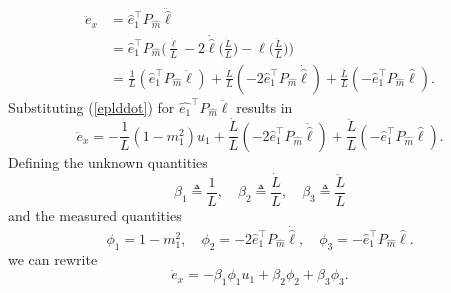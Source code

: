 \begin{align}
\ddot{e}_x&=\hat{e}_1^{\top}P_{\hat{m}}\ddot{\hat{\ell}}
\\&=\hat{e}_1^{\top}P_{\hat{m}}\bigg(\frac{\ddot{\ell}}{L}-2\dot{\hat{\ell}}\bigg(\frac{\dot{L}}{L}\bigg)-\hat{\ell}\bigg(\frac{\ddot{L}}{L}\bigg)\bigg)
\\&=\frac{1}{L}(\hat{e}_1^{\top}P_{\hat{m}}\ddot{\ell})+\frac{\dot{L}}{L}(-2\hat{e}_1^{\top}P_{\hat{m}}\dot{\hat{\ell}})+\frac{\ddot{L}}{L}(-\hat{e}_1^{\top}P_{\hat{m}}\hat{\ell}).
\end{align}
Substituting (\ref{eplddot}) for $\hat{e_1}^{\top}P_{\hat{m}}\ddot{\ell}$ results in  
\begin{equation}
\ddot{e}_x=-\frac{1}{L}(1-m_1^2)u_1+\frac{\dot{L}}{L}(-2\hat{e}_1^{\top}P_{\hat{m}}\dot{\hat{\ell}})+\frac{\ddot{L}}{L}(-\hat{e}_1^{\top}P_{\hat{m}}\hat{\ell}).
\end{equation} 
Defining the unknown quantities
\begin{equation}
\beta_1\triangleq\frac{1}{L},\quad \beta_2\triangleq\frac{\dot{L}}{L}, \quad \beta_3\triangleq\frac{\ddot{L}}{L}
\end{equation}
and the measured quantities
\begin{equation}
\phi_1=1-m_1^2,\quad \phi_2=-2\hat{e}_1^{\top}P_{\hat{m}}\dot{\hat{\ell}}, \quad \phi_3=-\hat{e}_1^{\top}P_{\hat{m}}\hat{\ell}.
\end{equation}
we can rewrite 
\begin{equation}
\ddot{e}_x=-\beta_1\phi_1u_1+\beta_2\phi_2+\beta_3\phi_3.
\label{exddot}
\end{equation}

